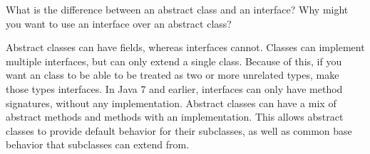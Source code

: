 What is the difference between an abstract class and an interface? Why might you want to use an interface over an abstract class? \\
\begin{answer}
Abstract classes can have fields, whereas interfaces cannot. Classes can implement multiple interfaces, but can only extend a single class. 
Because of this, if you want an class to be able to be treated as two or more unrelated types, make those types interfaces. 
In Java 7 and earlier, interfaces can only have method signatures, without any implementation. 
Abstract classes can have a mix of abstract methods and methods with an implementation. 
This allows abstract classes to provide default behavior for their subclasses, as well as common base behavior that subclasses can extend from.
\end{answer}
